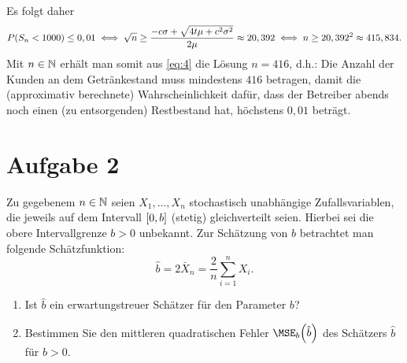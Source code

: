 \documentclass{exercise}
\begin{document}
\begin{enumerate}
        Es folgt daher
        \begin{equation}\label{eq:4}
            P\parentheses*{S_n < 1000} \le 0,01 \iff \sqrt{n} \ge \frac{-c\sigma + \sqrt{4t\mu + c^2 \sigma^2}}{2\mu} \approx 20,392 \iff n \ge 20,392^2 \approx 415,834.
        \end{equation}
        Mit \(n \in \N\) erhält man somit aus \eqref{eq:4} die Lösung \(n = 416\), d.h.: Die Anzahl der Kunden an dem Getränkestand muss mindestens \(416\) betragen, damit die (approximativ berechnete) Wahrscheinlichkeit dafür, dass der Betreiber abends noch einen (zu entsorgenden) Restbestand hat, höchstens \(0,01\) beträgt.
    \end{enumerate}
    
    
    \section*{Aufgabe 2}
    
    \begin{problem}
        Zu gegebenem \(n \in \N\) seien \(X_1, \ldots, X_n\) stochastisch unabhängige Zufallsvariablen, die jeweils auf dem Intervall \(\brackets*{0, b}\) (stetig) gleichverteilt seien.
        Hierbei sei die obere Intervallgrenze \(b > 0\) unbekannt.
        Zur Schätzung von \(b\) betrachtet man folgende Schätzfunktion:
        \[
            \hat{b} = 2\bar{X}_n = \frac{2}{n}\sum_{i = 1}^n X_i.
        \]
        \begin{enumerate}
            \item Ist \(\hat{b}\) ein erwartungstreuer Schätzer für den Parameter \(b\)?
            \item Bestimmen Sie den mittleren quadratischen Fehler \(\MSE_b\parentheses*{\hat{b}}\) des Schätzers \(\hat{b}\) für \(b > 0\).
        \end{enumerate}
    \end{problem}
    
\end{document}

